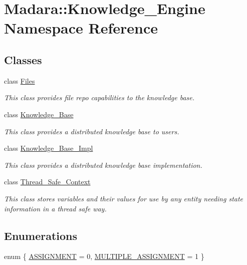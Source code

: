 \hypertarget{namespaceMadara_1_1Knowledge__Engine}{
\section{Madara::Knowledge\_\-Engine Namespace Reference}
\label{de/d92/namespaceMadara_1_1Knowledge__Engine}
}
\subsection*{Classes}
\begin{DoxyCompactItemize}
\item 
class \hyperlink{classMadara_1_1Knowledge__Engine_1_1Files}{Files}
\begin{DoxyCompactList}\small\item\em This class provides file repo capabilities to the knowledge base. \item\end{DoxyCompactList}\item 
class \hyperlink{classMadara_1_1Knowledge__Engine_1_1Knowledge__Base}{Knowledge\_\-Base}
\begin{DoxyCompactList}\small\item\em This class provides a distributed knowledge base to users. \item\end{DoxyCompactList}\item 
class \hyperlink{classMadara_1_1Knowledge__Engine_1_1Knowledge__Base__Impl}{Knowledge\_\-Base\_\-Impl}
\begin{DoxyCompactList}\small\item\em This class provides a distributed knowledge base implementation. \item\end{DoxyCompactList}\item 
class \hyperlink{classMadara_1_1Knowledge__Engine_1_1Thread__Safe__Context}{Thread\_\-Safe\_\-Context}
\begin{DoxyCompactList}\small\item\em This class stores variables and their values for use by any entity needing state information in a thread safe way. \item\end{DoxyCompactList}\end{DoxyCompactItemize}
\subsection*{Enumerations}
\begin{DoxyCompactItemize}
\item 
enum \{ \hyperlink{namespaceMadara_1_1Knowledge__Engine_a97d309bdbdc3d6bf6860f9addb0b06d1ac2b3a1be39c1ce49fde7f0893390a0fc}{ASSIGNMENT} =  0, 
\hyperlink{namespaceMadara_1_1Knowledge__Engine_a97d309bdbdc3d6bf6860f9addb0b06d1a4a76f48f3b1b468eb89812eb24126d14}{MULTIPLE\_\-ASSIGNMENT} =  1
 \}
\end{DoxyCompactItemize}


